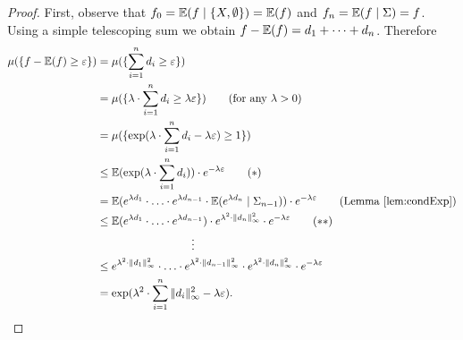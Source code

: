 \begin{proof} First, observe that $f_0=\mathbb{E}(f\mid \{X,\emptyset\})=\mathbb{E}(f)$ and $f_n=\mathbb{E}(f\mid\Sigma)=f$. Using a simple telescoping sum we obtain $f-\mathbb{E}(f)=d_1+\dots+d_n$. Therefore
	\begin{align*}
		\mu(\{f-\E(f)\geq \varepsilon\}) & =\mu(\{\sum_{i=1}^{n}d_i\geq  \varepsilon\})                                                                                                                            \\
		                                 & =\mu(\{\lambda\cdot\sum_{i=1}^{n}d_i\geq \lambda \varepsilon\})\tag{for any $\lambda>0$}                                                                                \\
		                                 & =\mu(\{\exp({\lambda\cdot\sum_{i=1}^{n}d_i-\lambda \varepsilon})\geq 1\})                                                                                               \\
		                                 & \leq\E(\exp({\lambda\cdot\sum_{i=1}^{n}d_i}))\cdot e^{-\lambda \varepsilon}\tag{$\ast$}                                                                                 \\
		                                 & =\E(e^{\lambda d_1}\cdot\ldots\cdot e^{\lambda d_{n-1}}\cdot\E(e^{\lambda d_n}\mid \Sigma_{n-1}))\cdot e^{-\lambda \varepsilon}\tag{Lemma \ref{lem:condExp}}            \\
		                                 & \leq\E(e^{\lambda d_1}\cdot\ldots\cdot e^{\lambda d_{n-1}})\cdot e^{\lambda^2\cdot \|d_n\|^2_\infty}\cdot e^{-\lambda \varepsilon}\tag{$\ast\ast$}                      \\
		                                 & \hspace{3cm}\vdots                                                                                                                                                      \\
		                                 & \leq e^{\lambda^2\cdot \|d_1\|^2_\infty}\cdot\ldots\cdot e^{\lambda^2\cdot \|d_{n-1}\|^2_\infty}\cdot e^{\lambda^2\cdot \|d_n\|^2_\infty}\cdot e^{-\lambda \varepsilon} \\
		                                 & =\exp({\lambda^2\cdot\sum_{i=1}^n\|d_i\|^2_\infty-\lambda \varepsilon}).                                                                                                
	\end{align*}
				

\end{proof}
